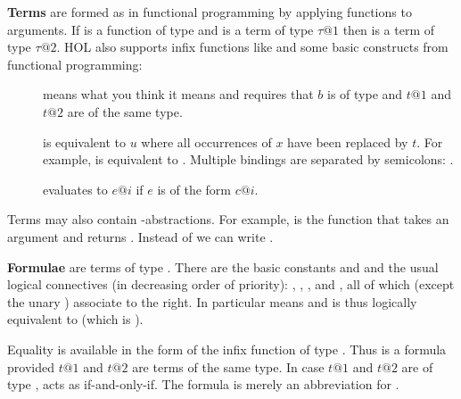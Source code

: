 \textbf{Terms} are formed as in functional programming by
applying functions to arguments. If  is a function of type
 and  is a term of type
$\tau@1$ then  is a term of type $\tau@2$. HOL also supports
infix functions like \isa{+} and some basic constructs from functional
programming:
\begin{description}
\item[]
means what you think it means and requires that
$b$ is of type  and $t@1$ and $t@2$ are of the same type.
\item[]
is equivalent to $u$ where all occurrences of $x$ have been replaced by
$t$. For example,
 is equivalent to . Multiple bindings are separated
by semicolons: .
\item[]
evaluates to $e@i$ if $e$ is of the form $c@i$.
\end{description}

Terms may also contain
\isasymlambda-abstractions. For example,
 is the function that takes an argument  and
returns . Instead of
 we can write
.

\textbf{Formulae} are terms of type .
There are the basic constants  and  and
the usual logical connectives (in decreasing order of priority):
, ,
, and ,
all of which (except the unary \isasymnot) associate to the right. In
particular  means  and is thus logically equivalent to  (which is ).

Equality is available in the form of the infix function
\isa{=} of type . Thus  is a formula provided $t@1$
and $t@2$ are terms of the same type. In case $t@1$ and $t@2$ are of type
, \isa{=} acts as if-and-only-if. The formula
 is merely an abbreviation for
.

